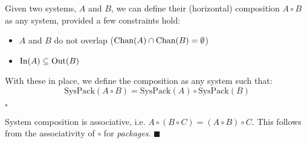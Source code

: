 \begin{definition}
Given two systems, $A$ and $B$, we can define their (horizontal) composition
$A \circ B$ as any system, provided a few constraints hold:
\begin{itemize}
\item $A$ and $B$ do not overlap ($\text{Chan}(A) \cap \text{Chan}(B) = \emptyset$)
\item $\text{In}(A) \subseteq \text{Out}(B)$
\end{itemize}

With these in place, we define the composition as any system such that:
$$
\text{SysPack}(A \circ B) =
\text{SysPack}(A) \circ \text{SysPack}(B)
$$

$\square$
\end{definition}

\begin{lemma}
System composition is associative, i.e. $A \circ (B \circ C) = (A \circ B) \circ C$.
 This follows from the associativity of $\circ$ for \emph{packages}. $\blacksquare$
\end{lemma}


